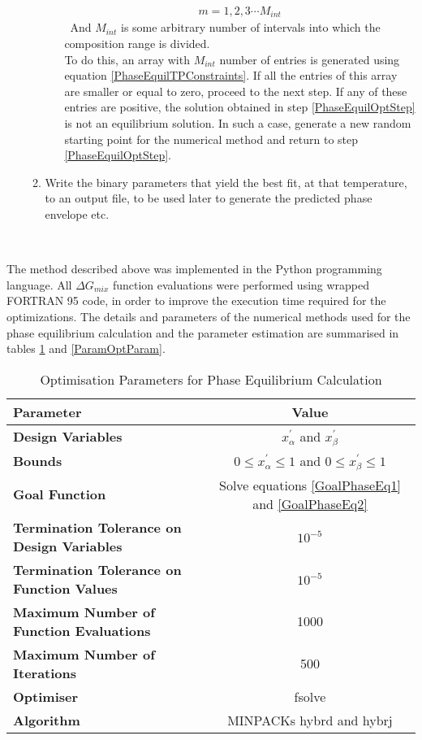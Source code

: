 \begin{enumerate}
\begin{enumerate}
\begin{enumerate}
\begin{eqnarray}
			m = 1,2,3 \cdots M_{int} \nonumber
			\end{eqnarray}\
			And $M_{int}$ is some arbitrary number of intervals into which the composition range is divided.\\
			To do this, an array with $M_{int}$ number of entries is generated using equation \ref{PhaseEquilTPConstraints}. If all the entries of 				this array are smaller or equal to zero, proceed to the next step. If any of these entries are positive, the solution obtained in step 				\ref{PhaseEquilOptStep} is not an equilibrium solution. In such a case, generate a new random starting point for the numerical method 				and return to step \ref{PhaseEquilOptStep}. 
		\end{enumerate}
		\item Write the binary parameters that yield the best fit, at that temperature, to an output file, to be used later to generate the predicted phase envelope etc.\		
	\end{enumerate}
\end{enumerate}\

The method described above was implemented in the Python programming language. All $\Delta G_{mix}$ function evaluations were performed using wrapped FORTRAN 95 code, in order to improve the execution time required for the optimizations. The details and parameters of the numerical methods used for the phase equilibrium calculation and the parameter estimation are summarised in tables \ref{PhaseEqOptParam} and \ref{ParamOptParam}.\\ 

\begin{table}
\begin{tabularx}{\textwidth}{l|c}
\hline
\textbf{Parameter}&\textbf{Value}\\
\hline
\hline
\textbf{Design Variables}&$x_{\alpha}^{\prime}$ and $x_{\beta}^{\prime}$\\
\textbf{Bounds}&$0 \leq x_{\alpha}^{\prime} \leq 1$ and $0 \leq x_{\beta}^{\prime} \leq 1 $\\
\textbf{Goal Function}& Solve equations \ref{GoalPhaseEq1} and \ref{GoalPhaseEq2} \\
\textbf{Termination Tolerance on Design Variables}&$10^{-5}$\\
\textbf{Termination Tolerance on Function Values}&$10^{-5}$\\
\textbf{Maximum Number of Function Evaluations}&1000\\
\textbf{Maximum Number of Iterations}&500\\				
\textbf{Optimiser }&fsolve\\
\textbf{Algorithm}&MINPACKs hybrd and hybrj \\
\hline
\end{tabularx}\\
\caption{Optimisation Parameters for Phase Equilibrium Calculation} \label{PhaseEqOptParam}			
\end{table}\

